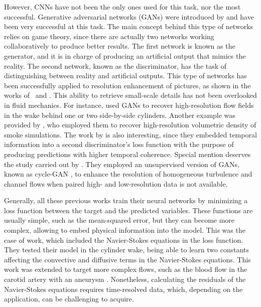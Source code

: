 However, CNNs have not been the only ones used for this task, nor the most successful.
Generative adversarial networks (GANs) were introduced by \citet{goodfellow2014generative} and have been very successful at this task.
The main concept behind this type of networks relies on game theory, since there are actually two networks working collaboratively to produce better results.
The first network is known as the generator, and it is in charge of producing an artificial output that mimics the reality.
The second network, known as the discriminator, has the task of distinguishing between reality and artificial outputs.
This type of networks has been successfully applied to resolution enhancement of pictures, as shown in the works of \citet{ledig2017photo} and \citet{wang2018esrgan}.
This ability to retrieve small-scale details has not been overlooked in fluid mechanics.
For instance, \citet{deng2019super} used GANs to recover high-resolution flow fields in the wake behind one or two side-by-side cylinders.
Another example was provided by \citet{werhahn2019multi}, who employed them to recover high-resolution volumetric density of smoke simulations.
The work by \citet{xie2018tempogan} is also interesting, since they embedded temporal information into a second discriminator's loss function with the purpose of producing predictions with higher temporal coherence.
Special mention deserves the study carried out by \citet{kim2021unsupervised}.
They employed an unsupervised version of GANs, known as cycle-GAN \citep{zhu2017unpaired}, to enhance the resolution of homogeneous turbulence and channel flows when paired high- and low-resolution data is not available.

Generally, all these previous works train their neural networks by minimizing a loss function between the target and the predicted variables.
These functions are usually simple, such as the mean-squared error, but they can become more complex, allowing to embed physical information into the model.
This was the case of \citet{raissi2019physics} work, which included the Navier-Stokes equations in the loss function.
They tested their model in the cylinder wake, being able to learn two constants affecting the convective and diffusive terms in the Navier-Stokes equations.
This work was extended to target more complex flows, such as the blood flow in the carotid artery with an aneurysm \citep{raissi2020hidden}.
Nonetheless, calculating the residuals of the Navier-Stokes equations requires time-resolved data, which, depending on the application, can be challenging to acquire.

